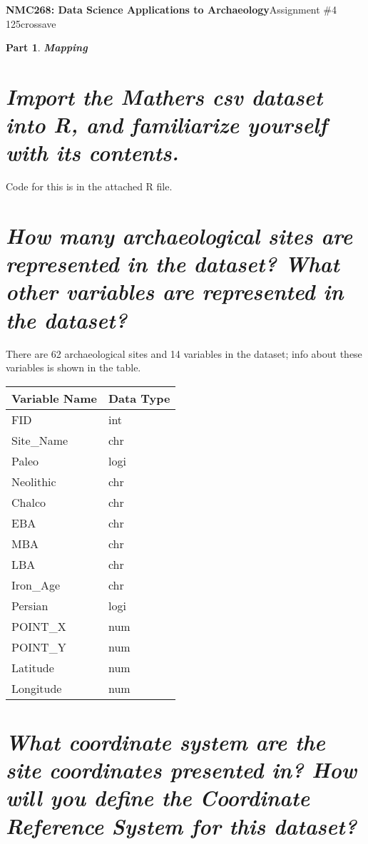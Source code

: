 \documentclass[answers]{exam}
\newtheorem{problem}{Part}
\begin{document}
\pagecolor{opp}
\noindent \textbf{NMC268: Data Science Applications to Archaeology}\hfill Assignment \#4\\
\color{nr}125crossave\color{black}

\hrulefill


\begin{problem}
\textbf{Mapping}
\end{problem}
\begin{parts}
    \part{\textit{Import the Mathers csv dataset into R, and familiarize yourself with its contents.}}

    \color{nr}\quad\quad Code for this is in the attached R file.

   \color{black}\part{\textit{How many archaeological sites are represented in the dataset? What other variables are represented in the dataset?}}

   \color{nr}\quad\quad There are 62 archaeological sites and 14 variables in the dataset; info about these variables is shown in the table.
\color{nr}
 \begin{center}
     \begin{tabularx}{0.8\textwidth} {
  | >{\centering\arraybackslash}X
  | >{\centering\arraybackslash}X | }
 \hline
 \textbf{Variable Name} & \textbf{Data Type} \\
 \hline
 FID & int \\
 \hline
 Site\_Name & chr\\
 \hline
 Paleo & logi\\
 \hline
 Neolithic & chr\\
  \hline
 Chalco & chr\\
  \hline
 EBA & chr\\
  \hline
 MBA & chr\\
 \hline
 LBA & chr\\
  \hline
 Iron\_Age & chr\\
  \hline
 Persian & logi\\
  \hline
 POINT\_X & num\\
  \hline
 POINT\_Y & num\\
  \hline
 Latitude & num\\
  \hline
 Longitude & num\\
 \hline
\end{tabularx}
\end{center}
  \color{black} \part{\textit{What coordinate system are the site coordinates presented in? How will you define the Coordinate Reference System for this dataset?}}


\end{parts}
\end{document}
